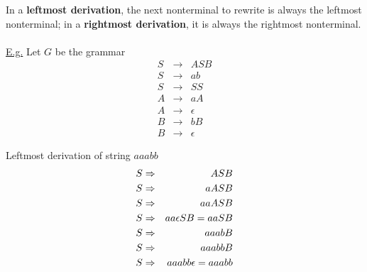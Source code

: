 \documentclass[8pt,letterpaper,twocolumn]{article}
\begin{document}
In a \textbf{leftmost derivation}, the next nonterminal to rewrite is always the leftmost nonterminal;
in a \textbf{rightmost derivation}, it is always the rightmost nonterminal. \\
\\
\underline{E.g.} %
Let $G$ be the grammar
\begin{eqnarray}
  S &\rightarrow& ASB \\
  S &\rightarrow& ab \\
  S &\rightarrow& SS \\
  A &\rightarrow& aA \\
  A &\rightarrow& \epsilon \\
  B &\rightarrow& bB \\
  B &\rightarrow& \epsilon
\end{eqnarray}

Leftmost derivation of string $aaabb$
  \begin{eqnarray}
    \setcounter{equation}{1}
    S &\Rightarrow& ASB \\
    \setcounter{equation}{4}
    S &\Rightarrow& aASB \\
    \setcounter{equation}{4}
    S &\Rightarrow& aaASB \\
    \setcounter{equation}{5}
    S &\Rightarrow& aa \epsilon SB = aaSB \\
    \setcounter{equation}{2}
    S &\Rightarrow& aaabB \\
    \setcounter{equation}{6}
    S &\Rightarrow& aaabbB \\
    \setcounter{equation}{7}
    S &\Rightarrow& aaabb\epsilon = aaabb
  \end{eqnarray}
\end{document}
